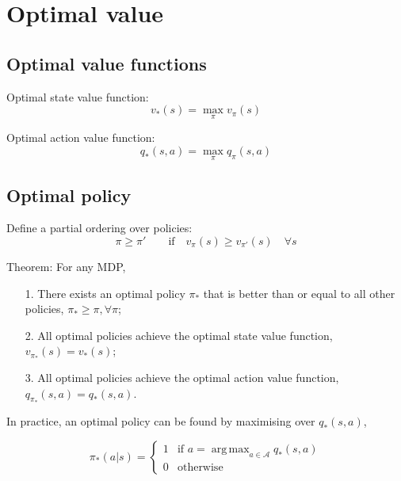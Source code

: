 \documentclass{article}
\DeclareMathOperator*{\argmax}{arg\,max}
\begin{document}
\section{Optimal value}
\subsection{Optimal value functions}
Optimal state value function:
\begin{equation}
    v_{*}(s) = \max_{\pi}v_{\pi}(s)
\end{equation}

Optimal action value function:
\begin{equation}
    q_{*}(s, a) = \max_{\pi}q_{\pi}(s, a)
\end{equation}

\subsection{Optimal policy}
Define a partial ordering over policies:
\begin{equation}
    \pi \geq \pi' \qquad \text{if} \quad v_{\pi}(s) \geq v_{\pi'}(s) \quad \forall s
\end{equation}

Theorem: For any MDP,
\begin{itemize}
    \item[1.] There exists an optimal policy $\pi_*$ that is better than or equal to all other policies, $\pi_* \geq \pi, \forall \pi$;
    \item[2.] All optimal policies achieve the optimal state value function, $v_{\pi_*}(s) = v_*(s)$;
    \item[3.] All optimal policies achieve the optimal action value function, $q_{\pi_*}(s, a) = q_*(s, a)$.
\end{itemize}

In practice, an optimal policy can be found by maximising over $q_*(s, a)$,

\begin{equation}
    \pi_*(a|s) = \left\{
    \begin{array}{cl}
       1  &  \text{if } a = \argmax_{a\in\mathcal{A}} q_*(s, a)\\
       0  & \text{otherwise}
    \end{array}
    \right.
\end{equation}
\end{document}
